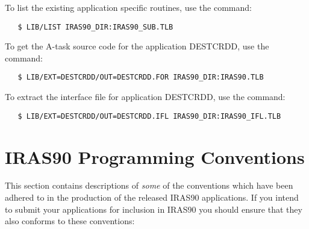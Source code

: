 To list the existing application specific routines, use the command:

\small
\begin{verbatim}
   $ LIB/LIST IRAS90_DIR:IRAS90_SUB.TLB
\end{verbatim}
\normalsize

To get the A-task source code for the application {\small DESTCRDD}, use the 
command:

\small
\begin{verbatim}
   $ LIB/EXT=DESTCRDD/OUT=DESTCRDD.FOR IRAS90_DIR:IRAS90.TLB
\end{verbatim}
\normalsize

To extract the interface file for application {\small DESTCRDD}, use the
command:

\small
\begin{verbatim}
   $ LIB/EXT=DESTCRDD/OUT=DESTCRDD.IFL IRAS90_DIR:IRAS90_IFL.TLB
\end{verbatim}
\normalsize

\section{IRAS90 Programming Conventions}
\label{SEC:CONV}

This section contains descriptions of {\em some} of the conventions
which have been adhered to in the production of the released {\small
IRAS90} applications.  If you intend to submit your applications for
inclusion in {\small IRAS90} you should ensure that they also conforms
to these conventions:

